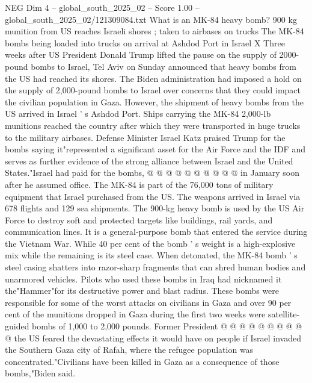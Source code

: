 \begin{textsample}{NEG Dim 4 – global\_south\_2025\_02 – Score 1.00 – global\_south\_2025\_02/121309084.txt}  \label{ex:f4_neg_436}
What is an MK-84 heavy bomb? 900 kg munition from US reaches Israeli shores ; taken to airbases on trucks The MK-84 bombs being loaded into trucks on arrival at Ashdod Port in Israel X Three weeks after US President Donald Trump lifted the pause on the supply of 2000-pound bombs to Israel, Tel Aviv on Sunday announced that heavy bombs from the US had reached its shores.
The Biden administration had imposed a hold on the supply of 2,000-pound bombs to Israel over concerns that they could impact the civilian population in Gaza.
However, the shipment of heavy bombs from the US arrived in Israel ' s Ashdod Port.
Ships carrying the MK-84 2,000-lb munitions reached the country after which they were transported in huge trucks to the military airbases.
Defense Minister Israel Katz praised Trump for the bombs saying it"represented a significant asset for the Air Force and the IDF and serves as further evidence of the strong alliance between Israel and the United States."Israel had paid for the bombs, @ @ @ @ @ @ @ @ @ @ in January soon after he assumed office.
The MK-84 is part of the 76,000 tons of military equipment that Israel purchased from the US.
The weapons arrived in Israel via 678 flights and 129 sea shipments.
The 900-kg heavy bomb is used by the US Air Force to destroy soft and protected targets like buildings, rail yards, and communication lines.
It is a general-purpose bomb that entered the service during the Vietnam War.
While 40 per cent of the bomb ' s weight is a high-explosive mix while the remaining is its steel case.
When detonated, the MK-84 bomb ' s steel casing shatters into razor-sharp fragments that can shred human bodies and unarmored vehicles.
Pilots who used these bombs in Iraq had nicknamed it the"Hammer"for its destructive power and blast radius.
These bombs were responsible for some of the worst attacks on civilians in Gaza and over 90 per cent of the munitions dropped in Gaza during the first two weeks were satellite-guided bombs of 1,000 to 2,000 pounds.
Former President @ @ @ @ @ @ @ @ @ @ the US feared the devastating effects it would have on people if Israel invaded the Southern Gaza city of Rafah, where the refugee population was concentrated."Civilians have been killed in Gaza as a consequence of those bombs,"Biden said.

\end{textsample}
